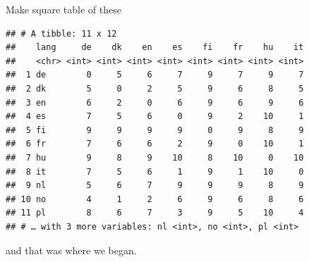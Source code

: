 \documentclass[ignorenonframetext,]{beamer}
\newenvironment{Shaded}{\begin{snugshade}}{\end{snugshade}}
\newcommand{\DataTypeTok}[1]{\textcolor[rgb]{0.13,0.29,0.53}{#1}}
\newcommand{\KeywordTok}[1]{\textcolor[rgb]{0.13,0.29,0.53}{\textbf{#1}}}
\newcommand{\NormalTok}[1]{#1}
\newcommand{\OperatorTok}[1]{\textcolor[rgb]{0.81,0.36,0.00}{\textbf{#1}}}
\newcommand{\StringTok}[1]{\textcolor[rgb]{0.31,0.60,0.02}{#1}}
\begin{document}
\begin{frame}[fragile]{Make square table of these}
\protect\hypertarget{make-square-table-of-these}{}

\scriptsize

\begin{Shaded}
\end{Shaded}

\begin{verbatim}
## # A tibble: 11 x 12
##    lang     de    dk    en    es    fi    fr    hu    it
##    <chr> <int> <int> <int> <int> <int> <int> <int> <int>
##  1 de        0     5     6     7     9     7     9     7
##  2 dk        5     0     2     5     9     6     8     5
##  3 en        6     2     0     6     9     6     9     6
##  4 es        7     5     6     0     9     2    10     1
##  5 fi        9     9     9     9     0     9     8     9
##  6 fr        7     6     6     2     9     0    10     1
##  7 hu        9     8     9    10     8    10     0    10
##  8 it        7     5     6     1     9     1    10     0
##  9 nl        5     6     7     9     9     9     8     9
## 10 no        4     1     2     6     9     6     8     6
## 11 pl        8     6     7     3     9     5    10     4
## # … with 3 more variables: nl <int>, no <int>, pl <int>
\end{verbatim}

\normalsize

and that was where we began.

\end{frame}
\end{document}

